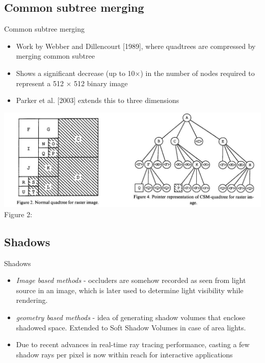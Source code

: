 \documentclass{beamer}
\begin{document}
\subsection{Common subtree merging}
\begin{frame}{Common subtree merging}
\begin{itemize}
	\item Work by Webber and Dillencourt [1989], where quadtrees  are compressed by merging common subtree
	\item Shows a significant decrease (up to 10×) in the
number of nodes required to represent a 512 × 512 binary image
	\item Parker et al. [2003] extends this to three dimensions
\end{itemize}
\includegraphics[scale=0.3]{images/CSM.jpg}{ Figure 2:}
\end{frame}

\subsection{Shadows}
\begin{frame}{Shadows}
\begin{itemize}
	\item \textit{Image based methods} - occluders are somehow recorded as seen from light source in an image, which is later used to determine light visibility while rendering.
	\item \textit{geometry based methods} - idea of generating shadow volumes that enclose shadowed space. Extended to Soft Shadow Volumes in case of area lights.
	\item Due to recent advances in real-time ray tracing performance, casting a few shadow rays per pixel is now within reach for interactive applications
\end{itemize}
\end{frame}
\end{document}
